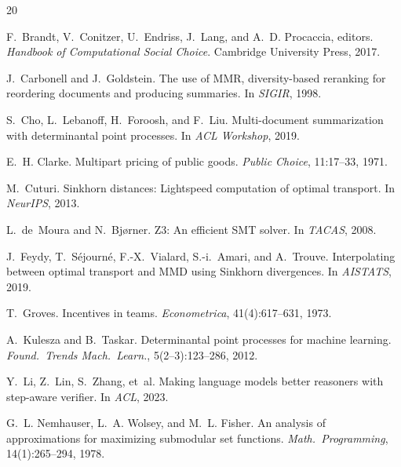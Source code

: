 \documentclass[10pt]{article}
\begin{document}

\begin{thebibliography}{20}

F.~Brandt, V.~Conitzer, U.~Endriss, J.~Lang, and A.~D. Procaccia, editors.
\newblock \emph{Handbook of Computational Social Choice}.
\newblock Cambridge University Press, 2017.

J.~Carbonell and J.~Goldstein.
\newblock The use of MMR, diversity-based reranking for reordering documents and producing summaries.
\newblock In \emph{SIGIR}, 1998.

S.~Cho, L.~Lebanoff, H.~Foroosh, and F.~Liu.
\newblock Multi-document summarization with determinantal point processes.
\newblock In \emph{ACL Workshop}, 2019.

E.~H. Clarke.
\newblock Multipart pricing of public goods.
\newblock \emph{Public Choice}, 11:17--33, 1971.

M.~Cuturi.
\newblock Sinkhorn distances: Lightspeed computation of optimal transport.
\newblock In \emph{NeurIPS}, 2013.

L.~de~Moura and N.~Bj{\o}rner.
\newblock Z3: An efficient SMT solver.
\newblock In \emph{TACAS}, 2008.

J.~Feydy, T.~S\'{e}journ\'{e}, F.-X.~Vialard, S.-i.~Amari, and A.~Trouve.
\newblock Interpolating between optimal transport and MMD using Sinkhorn divergences.
\newblock In \emph{AISTATS}, 2019.

T.~Groves.
\newblock Incentives in teams.
\newblock \emph{Econometrica}, 41(4):617--631, 1973.

A.~Kulesza and B.~Taskar.
\newblock Determinantal point processes for machine learning.
\newblock \emph{Found.\ Trends Mach.\ Learn.}, 5(2--3):123--286, 2012.

Y.~Li, Z.~Lin, S.~Zhang, et~al.
\newblock Making language models better reasoners with step-aware verifier.
\newblock In \emph{ACL}, 2023.

G.~L. Nemhauser, L.~A. Wolsey, and M.~L. Fisher.
\newblock An analysis of approximations for maximizing submodular set functions.
\newblock \emph{Math.\ Programming}, 14(1):265--294, 1978.


\end{thebibliography}
\end{document}
